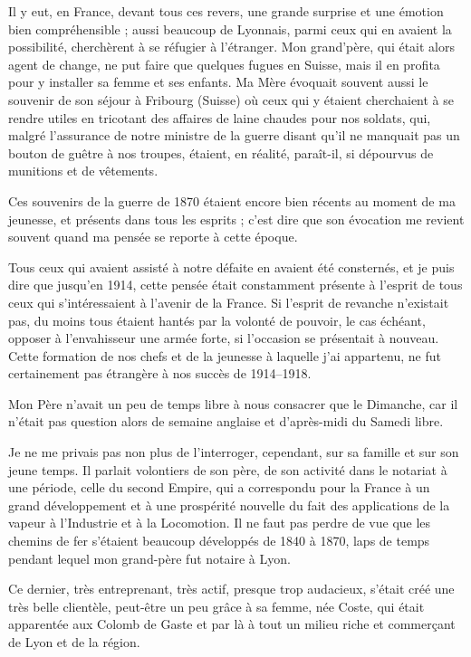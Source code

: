\documentclass[11pt,a4paper]{report}
\begin{document}
Il y eut, en France, devant tous ces revers, une grande surprise et une émotion bien compréhensible ; aussi beaucoup de Lyonnais, parmi ceux qui en avaient la possibilité, cherchèrent à se réfugier à l'étranger. Mon grand'père, qui était alors agent de change, ne put faire que quelques fugues en Suisse, mais il en profita pour y installer sa femme et ses enfants. Ma Mère évoquait souvent aussi le souvenir de son séjour à Fribourg (Suisse) où ceux qui y étaient cherchaient à se rendre utiles en tricotant des affaires de laine chaudes pour nos soldats, qui, malgré l'assurance de notre ministre de la guerre disant qu'il ne manquait pas un bouton de guêtre à nos troupes, étaient, en réalité, paraît-il, si dépourvus de munitions et de vêtements.

Ces souvenirs de la guerre de 1870 étaient encore bien récents au moment de ma jeunesse, et présents dans tous les esprits ; c'est dire que son évocation me revient souvent quand ma pensée se reporte à cette époque.

Tous ceux qui avaient assisté à notre défaite en avaient été consternés, et je puis dire que jusqu'en 1914, cette pensée était constamment présente à l'esprit de tous ceux qui s'intéressaient à l'avenir de la France. Si l'esprit de revanche n'existait pas, du moins tous étaient hantés par la volonté de pouvoir, le cas échéant, opposer à l'envahisseur une armée forte, si l'occasion se présentait à nouveau. Cette formation de nos chefs et de la jeunesse à laquelle j'ai appartenu, ne fut certainement pas étrangère à nos succès de 1914--1918.

Mon Père n'avait un peu de temps libre à nous consacrer que le Dimanche, car il n'était pas question alors de semaine anglaise et d'après-midi du Samedi libre.

Je ne me privais pas non plus de l'interroger, cependant, sur sa famille et sur son jeune temps. Il parlait volontiers de son père, de son activité dans le notariat à une période, celle du second Empire, qui a correspondu pour la France à un grand développement et à une prospérité nouvelle du fait des applications de la vapeur à l'Industrie et à la Locomotion. Il ne faut pas perdre de vue que les chemins de fer s'étaient beaucoup développés de 1840 à 1870, laps de temps pendant lequel mon grand-père fut notaire à Lyon.

Ce dernier, très entreprenant, très actif, presque trop audacieux, s'était créé une très belle clientèle, peut-être un peu grâce à sa femme, née Coste, qui était apparentée aux Colomb de Gaste et par là à tout un milieu riche et commerçant de Lyon et de la région.
\end{document}
